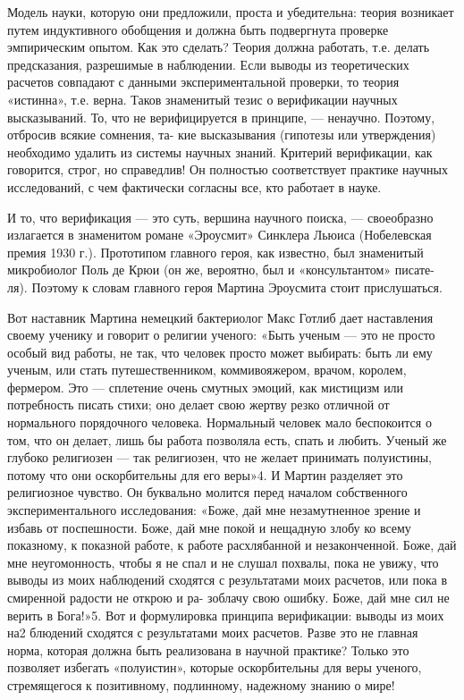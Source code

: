 \documentclass[11pt,a4paper]{article}
\begin{document}
Модель науки, которую они предложили, проста и убедительна: теория возникает
путем индуктивного обобщения и должна быть подвергнута проверке эмпирическим
опытом. Как это сделать? Теория должна работать, т.е. делать предсказания,
разрешимые в наблюдении. Если выводы из теоретических расчетов совпадают с
данными экспериментальной проверки, то теория «истинна», т.е. верна. Таков
знаменитый тезис о верификации научных высказываний. То, что не
верифицируется в принципе, — ненаучно. Поэтому, отбросив всякие сомнения, та-
кие высказывания (гипотезы или утверждения) необходимо удалить из системы
научных знаний. Критерий верификации, как говорится, строг, но справедлив! Он
полностью соответствует практике научных исследований, с чем фактически
согласны все, кто работает в науке.

И то, что верификация — это суть, вершина научного поиска, — своеобразно
излагается в знаменитом романе «Эроусмит» Синклера Льюиса (Нобелевская
премия 1930 г.). Прототипом главного героя, как известно, был знаменитый
микробиолог Поль де Крюи (он же, вероятно, был и «консультантом» писате-
ля). Поэтому к словам главного героя Мартина Эроусмита стоит прислушаться.

Вот наставник Мартина немецкий бактериолог Макс Готлиб дает наставления своему
ученику и говорит о религии ученого: «Быть ученым — это не просто особый вид
работы, не так, что человек просто может выбирать: быть ли ему ученым, или
стать путешественником, коммивояжером, врачом, королем, фермером. Это —
сплетение очень смутных эмоций, как мистицизм или потребность писать стихи;
оно делает свою жертву резко отличной от нормального порядочного
человека. Нормальный человек мало беспокоится о том, что он делает, лишь бы
работа позволяла есть, спать и любить. Ученый же глубоко религиозен — так
религиозен, что не желает принимать полуистины, потому что они оскорбительны
для его веры»4. И Мартин разделяет это религиозное чувство. Он буквально
молится перед началом собственного экспериментального исследования: «Боже,
дай мне незамутненное зрение и избавь от поспешности. Боже, дай мне покой и
нещадную злобу ко всему показному, к показной работе, к работе расхлябанной
и незаконченной. Боже, дай мне неугомонность, чтобы я не спал и не слушал
похвалы, пока не увижу, что выводы из моих наблюдений сходятся с
результатами моих расчетов, или пока в смиренной радости не открою и ра-
зоблачу свою ошибку. Боже, дай мне сил не верить в Бога!»5. Вот и формулировка
принципа верификации: выводы из моих на2 блюдений сходятся с результатами моих
расчетов. Разве это не главная норма, которая должна быть реализована в
научной практике? Только это позволяет избегать «полуистин», которые
оскорбительны для веры ученого, стремящегося к позитивному, подлинному,
надежному знанию о мире!
\end{document}

